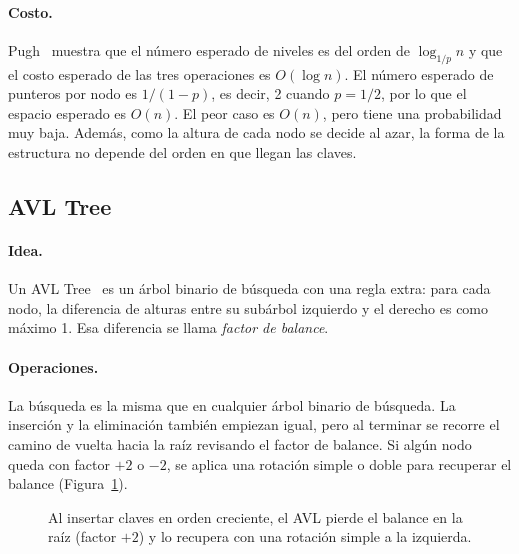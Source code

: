\documentclass[11pt,a4paper]{article}
\begin{document}
\paragraph{Costo.}
Pugh~\cite{pugh1990} muestra que el número esperado de niveles es del orden de
$\log_{1/p} n$ y que el costo esperado de las tres operaciones es $O(\log n)$.
El número esperado de punteros por nodo es $1/(1-p)$, es decir, 2 cuando
$p = 1/2$, por lo que el espacio esperado es $O(n)$. El peor caso es $O(n)$,
pero tiene una probabilidad muy baja. Además, como la altura de cada nodo se
decide al azar, la forma de la estructura no depende del orden en que llegan
las claves.

\subsection{AVL Tree}

\paragraph{Idea.}
Un AVL Tree~\cite{avl1962} es un árbol binario de búsqueda con una regla extra:
para cada nodo, la diferencia de alturas entre su subárbol izquierdo y el
derecho es como máximo 1. Esa diferencia se llama \emph{factor de balance}.

\paragraph{Operaciones.}
La búsqueda es la misma que en cualquier árbol binario de búsqueda. La
inserción y la eliminación también empiezan igual, pero al terminar se
recorre el camino de vuelta hacia la raíz revisando el factor de balance. Si
algún nodo queda con factor $+2$ o $-2$, se aplica una rotación simple o doble
para recuperar el balance (Figura~\ref{fig:avl}).

\begin{figure}[!htb]
\centering
{}
\caption{Al insertar claves en orden creciente, el AVL pierde el balance en la
raíz (factor $+2$) y lo recupera con una rotación simple a la izquierda.}
\label{fig:avl}
\end{figure}
\end{document}
